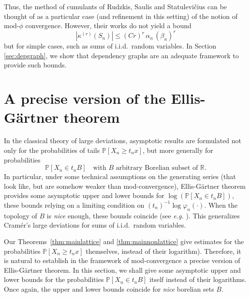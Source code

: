 \documentclass[12pt,a4paper,reqno]{amsart}
\theoremstyle{remark}
\newcommand{\R}{\mathbb{R}}
\newcommand{\proba}{\mathbb{P}}
\newcommand{\alphan}{\alpha_n}
\newcommand{\betan}{\beta_n}
\begin{document}
Thus, the method of cumulants of Rudzkis, Saulis and Statulevi\v{c}ius can be thought of as a particular case (and refinement in this setting) of the notion of mod-$\phi$ convergence. However, their works do not yield a bound
$$|\kappa^{(r)}(S_{n})|\leq (Cr)^{r}\,\alphan\,(\betan)^{r}$$
but for simple cases, such as sums of i.i.d.~random variables. 
In Section \ref{sec:depgraph}, we show that dependency graphs
are an adequate framework to provide such bounds.\bigskip
\bigskip




















\section{A precise version of the Ellis-G\"artner theorem}\label{sec:precisellis}

In the classical theory of large deviations, asymptotic results are formulated not only for the probabilities of tails $\proba[X_{n}\geq t_{n}x]$, but more generally for probabilities
$$\proba[X_{n} \in t_{n}B]\quad \text{with $B$ arbitrary Borelian subset of $\R$}.$$
In particular, under some technical assumptions on the generating series (that look like, but are somehow weaker than mod-convergence),  Ellis-G\"artner theorem provides some asymptotic upper and lower bounds for $\log(\proba[X_{n} \in t_{n}B])$, these bounds relying on a limiting condition on $(t_n)^{-1} \log\varphi_n(\cdot)$. When the topology of $B$ is {\em nice} enough, these bounds coincide  (see \emph{e.g.} \cite[Theorem 2.3.6]{DZ98}). This generalizes Cram\'er's large deviations for sums of i.i.d.~random variables. \bigskip

Our Theorems~\ref{thm:mainlattice} and \ref{thm:mainnonlattice} give estimates for the probabilities $\proba[X_{n} \geq t_{n}x]$ themselves, instead of their logarithm). Therefore, it is  natural to establish in the framework of mod-convergence a precise version of Ellis-G\"artner theorem. In this section, we shall give some asymptotic upper and lower bounds for the probabilities $\proba[X_{n} \in t_{n}B]$ itself instead of their logarithms. Once again, the upper and lower bounds coincide for {\em nice} borelian sets $B$.\medskip
\end{document}
